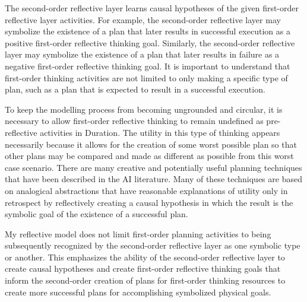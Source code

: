 The second-order reflective layer learns causal hypotheses of the
given first-order reflective layer activities.  For example, the
second-order reflective layer may symbolize the existence of a plan
that later results in successful execution as a positive first-order
reflective thinking goal.  Similarly, the second-order reflective
layer may symbolize the existence of a plan that later results in
failure as a negative first-order reflective thinking goal.  It is
important to understand that first-order thinking activities are not
limited to only making a specific type of plan, such as a plan that is
expected to result in a successful execution.

To keep the modelling process from becoming ungrounded and circular,
it is necessary to allow first-order reflective thinking to remain
undefined as pre-reflective activities in Duration.  The utility in
this type of thinking appears necessarily because it allows for the
creation of some worst possible plan so that other plans may be
compared and made as different as possible from this worst case
scenario.  There are many creative and potentially useful planning
techniques that have been described in the AI literature.  Many of
these techniques are based on analogical abstractions that have
reasonable explanations of utility only in retrospect by reflectively
creating a causal hypothesis in which the result is the symbolic goal
of the existence of a successful plan.

My reflective model does not limit first-order planning activities to
being subsequently recognized by the second-order reflective layer as
one symbolic type or another.  This emphasizes the ability of the
second-order reflective layer to create causal hypotheses and create
first-order reflective thinking goals that inform the second-order
creation of plans for first-order thinking resources to create more
successful plans for accomplishing symbolized physical goals.

